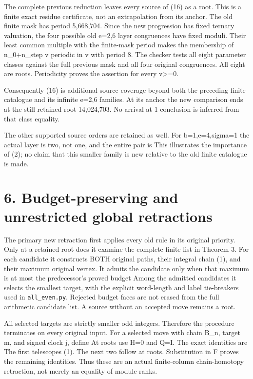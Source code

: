 The complete previous reduction leaves every source of (16) as a root.
This is a finite exact residue certificate, not an extrapolation from
its anchor. The old finite mask has period 5,668,704. Since the new
progression has fixed ternary valuation, the four possible old e=2,6
layer congruences have fixed moduli. Their least common multiple with
the finite-mask period makes the membership of n\_0+n\_step v periodic
in v with period 8. The checker tests all eight parameter classes
against the full previous mask and all four original congruences. All
eight are roots. Periodicity proves the assertion for every
v\textgreater=0.

Consequently (16) is additional source coverage beyond both the
preceding finite catalogue and its infinite e=2,6 families. At its
anchor the new comparison ends at the still-retained root 14,024,703. No
arrival-at-1 conclusion is inferred from that class equality.

The other supported source orders are retained as well. For
b=1,e=4,sigma=1 the actual layer is two, not one, and the entire pair is
 This illustrates the importance of
(2); no claim that this smaller family is new relative to the old finite
catalogue is made.

\section{6. Budget-preserving and unrestricted global retractions}

The primary new retraction first applies every old rule in its original
priority. Only at a retained root does it examine the complete finite
list in Theorem 3. For each candidate it constructs BOTH original paths,
their integral chain (1), and their maximum original vertex. It admits
the candidate only when that maximum is at most the predecessor's proved
budget
Among the admitted candidates it selects the smallest target, with the
explicit word-length and label tie-breakers used in
\nolinkurl{all_even.py}. Rejected budget faces are not erased from the
full arithmetic candidate list. A source without an accepted move
remains a root.

All selected targets are strictly smaller odd integers. Therefore the
procedure terminates on every original input. For a selected move with
chain B\_n, target m, and signed clock j, define
 At roots use H=0 and Q=I. The exact
identities are  The first
telescopes (1). The next two follow at roots. Substitution in F proves
the remaining identities. Thus these are an actual finite-column
chain-homotopy retraction, not merely an equality of module ranks.

